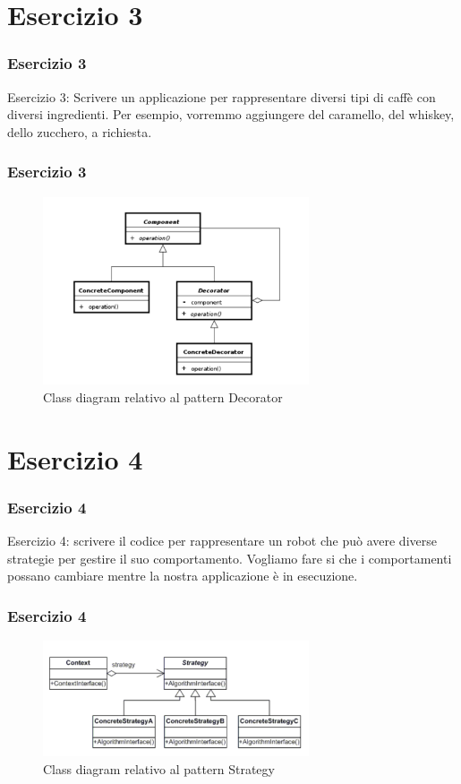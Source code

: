 \documentclass{beamer}
\begin{document}
\section{Esercizio 3}
\begin{frame}
\frametitle{Esercizio 3}
Esercizio 3: Scrivere un applicazione per rappresentare diversi tipi di caff\`e con diversi ingredienti. Per esempio, vorremmo aggiungere del caramello, del whiskey, dello zucchero, a richiesta.
\end{frame}

\begin{frame}
\frametitle{Esercizio 3}
\begin{figure}[h]
\centering
\includegraphics[width=0.7\textwidth]{Img/Decorator.pdf}
\caption{Class diagram relativo al pattern Decorator}
\label{Fig:DecoratorConcepts}
\end{figure}
\end{frame}


\section{Esercizio 4}
\begin{frame}
\frametitle{Esercizio 4}
Esercizio 4: scrivere il codice per rappresentare un robot che pu\`o avere diverse strategie per gestire il suo comportamento. Vogliamo fare si che i comportamenti possano cambiare mentre la nostra applicazione \`e in esecuzione.
\end{frame}

\begin{frame}
\frametitle{Esercizio 4}
\begin{figure}[h]
\centering
\includegraphics[width=0.7\textwidth]{Img/Strategy.pdf}
\caption{Class diagram relativo al pattern Strategy}
\label{Fig:StrategyConcepts}
\end{figure}
\end{frame}
\end{document}
